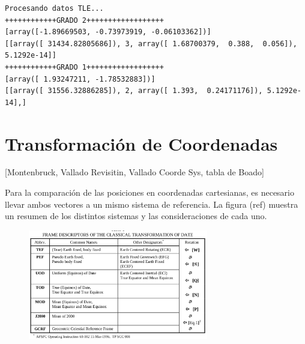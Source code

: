 \begin{verbatim}
Procesando datos TLE...
++++++++++++GRADO 2++++++++++++++++++
[array([-1.89669503, -0.73973919, -0.06103362])]
[[array([ 31434.82805686]), 3, array([ 1.68700379,  0.388,  0.056]), 5.1292e-14]]
++++++++++++GRADO 1++++++++++++++++++
[array([ 1.93247211, -1.78532883])]
[[array([ 31556.32886285]), 2, array([ 1.393,  0.24171176]), 5.1292e-14],]
\end{verbatim}

% 

\section{Transformaci\'on de Coordenadas}
[Montenbruck, Vallado Revisitin, Vallado Coorde Sys, tabla de Boado]

Para la comparaci\'on de las posiciones en coordenadas cartesianas, es necesario llevar ambos vectores a un mismo sistema de referencia.
La figura (ref) muestra un resumen de los distintos sistemas y las consideraciones de cada uno. 

\begin{figure}[!h]
  \centering
  \includegraphics[width=0.7\textwidth]{imagenes/sistReferencias}
\end{figure}

